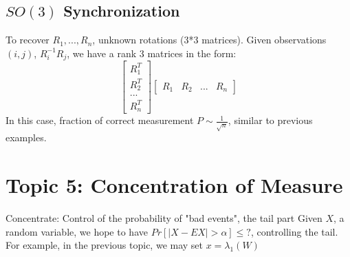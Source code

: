 \documentclass[11pt,letter]{article}
\begin{document}
\subsection{$SO(3)$ Synchronization}
To recover $R_1,...,R_n$, unknown rotations (3*3 matrices).
Given observations $(i,j)$, $R_i^{-1}R_j$, we have a rank 3 matrices in the form:
\[
\begin{bmatrix}
R_1^T \\
R_2^T \\
... \\
R_n^T
\end{bmatrix}
\begin{bmatrix}
R_1 & R_2&...&R_n
\end{bmatrix}
\]
In this case, fraction of correct measurement $P\sim \frac{1}{\sqrt{n}}$, similar to previous examples.

\section{Topic 5: Concentration of Measure}

Concentrate: Control of the probability of "bad events", the tail part
Given $X$, a random variable, we hope to have $Pr[|X-EX|>\alpha]\leq ?$, controlling the tail. For example, in the previous topic, we may set $x=\lambda_1(W)$
\end{document}
